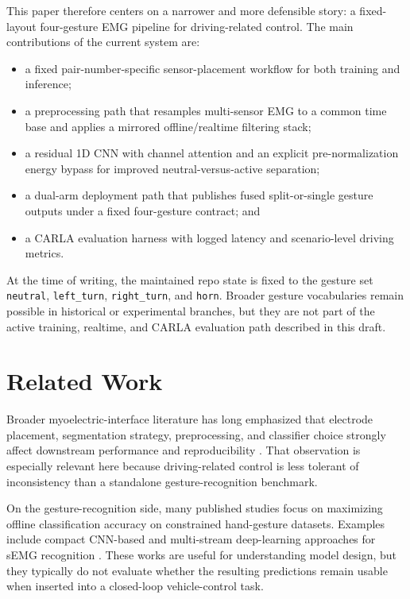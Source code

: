 \documentclass[11pt]{article}
\begin{document}
This paper therefore centers on a narrower and more defensible story: a fixed-layout four-gesture EMG pipeline for driving-related control. The main contributions of the current system are:
\begin{itemize}[leftmargin=1.5em]
\item a fixed pair-number-specific sensor-placement workflow for both training and inference;
\item a preprocessing path that resamples multi-sensor EMG to a common time base and applies a mirrored offline/realtime filtering stack;
\item a residual 1D CNN with channel attention and an explicit pre-normalization energy bypass for improved neutral-versus-active separation;
\item a dual-arm deployment path that publishes fused split-or-single gesture outputs under a fixed four-gesture contract; and
\item a CARLA evaluation harness with logged latency and scenario-level driving metrics.
\end{itemize}

At the time of writing, the maintained repo state is fixed to the gesture set \texttt{neutral}, \texttt{left\_turn}, \texttt{right\_turn}, and \texttt{horn}. Broader gesture vocabularies remain possible in historical or experimental branches, but they are not part of the active training, realtime, and CARLA evaluation path described in this draft.

\section{Related Work}
Broader myoelectric-interface literature has long emphasized that electrode placement, segmentation strategy, preprocessing, and classifier choice strongly affect downstream performance and reproducibility \cite{hakonen2015,jaramillo2020}. That observation is especially relevant here because driving-related control is less tolerant of inconsistency than a standalone gesture-recognition benchmark.

On the gesture-recognition side, many published studies focus on maximizing offline classification accuracy on constrained hand-gesture datasets. Examples include compact CNN-based and multi-stream deep-learning approaches for sEMG recognition \cite{chen2020,shin2024}. These works are useful for understanding model design, but they typically do not evaluate whether the resulting predictions remain usable when inserted into a closed-loop vehicle-control task.
\end{document}
